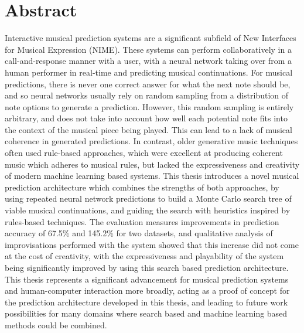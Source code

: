 \chapter*{Abstract}

Interactive musical prediction systems are a significant subfield of New Interfaces for Musical Expression (NIME). These systems can perform collaboratively in a call-and-response manner with a user, with a neural network taking over from a human performer in real-time and predicting musical continuations. For musical predictions, there is never one correct answer for what the next note should be, and so neural networks usually rely on random sampling from a distribution of note options to generate a prediction. However, this random sampling is entirely arbitrary, and does not take into account how well each potential note fits into the context of the musical piece being played. This can lead to a lack of musical coherence in generated predictions. In contrast, older generative music techniques often used rule-based approaches, which were excellent at producing coherent music which adheres to musical rules, but lacked the expressiveness and creativity of modern machine learning based systems. This thesis introduces a novel musical prediction architecture which combines the strengths of both approaches, by using repeated neural network predictions to build a Monte Carlo search tree of viable musical continuations, and guiding the search with heuristics inspired by rules-based techniques. The evaluation measures improvements in prediction accuracy of 67.5\% and 145.2\% for two datasets, and qualitative analysis of improvisations performed with the system showed that this increase did not come at the cost of creativity, with the expressiveness and playability of the system being significantly improved by using this search based prediction architecture. This thesis represents a significant advancement for musical prediction systems and human-computer interaction more broadly, acting as a proof of concept for the prediction architecture developed in this thesis, and leading to future work possibilities for many domains where search based and machine learning based methods could be combined.